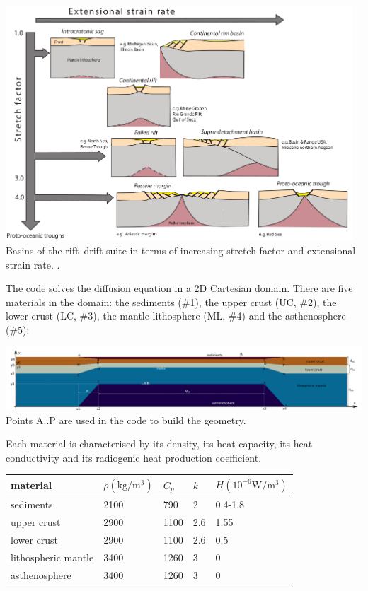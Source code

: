 \begin{center}
\includegraphics[width=13cm]{python_codes/fieldstone_86/images/allenallen}\\
{\captionfont Basins of the rift–drift suite in terms of increasing stretch factor 
and extensional strain rate. \cite{allen2013}.} 
\end{center}




The code solves the diffusion equation in a 2D Cartesian domain. There are 
five materials in the domain: the sediments (\#1), the upper crust (UC, \#2), 
the lower crust (LC, \#3), the mantle lithosphere (ML, \#4) and the asthenosphere (\#5):

\begin{center}
\includegraphics[width=17cm]{python_codes/fieldstone_86/images/setup}\\
{\captionfont Points A..P are used in the code to build the geometry.}
\end{center}

Each material is characterised by its density, its heat capacity, its heat conductivity
and its radiogenic heat production coefficient.

\begin{center}
\begin{tabular}{lllll}
\hline
material & $\rho (\si{\kilogram\per\cubic\metre})$ & $C_p$ & $k$ & $H (10^{-6}\si{\watt\per\cubic\meter})$ \\
\hline
\hline
sediments           & 2100 & 790  & 2   & 0.4-1.8\\ 
upper crust         & 2900 & 1100 & 2.6 & 1.55\\ 
lower crust         & 2900 & 1100 & 2.6 & 0.5\\ 
lithospheric mantle & 3400 & 1260 & 3   & 0\\ 
asthenosphere       & 3400 & 1260 & 3   & 0\\ 
\hline
\end{tabular}
\end{center}


